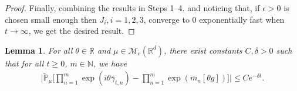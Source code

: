 \documentclass[12pt,a4paper]{amsart}
\theoremstyle{plain}
\newtheorem{lem}[thm]{Lemma}
\theoremstyle{definition}
\numberwithin{equation}{section}
\begin{document}
\begin{proof}
Finally, combining the results in Steps 1--4. and noticing that, if $\epsilon>0$ is chosen small enough then $J_{i}, i = 1,2,3$, converge to $0$ exponentially fast when $t\rightarrow\infty$, we get the desired result.
\end{proof}

\begin{lem}\label{lem:lemma03}
    For all $\theta\in \mathbb{R}$ and $\mu \in \mathcal{M}_c(\mathbb{R}^d)$, there exist constants $C,\delta>0$ such that for all $t\geq 0$, $m\in\mathbb{N}$, we have
    \begin{align}\label{ineq: next we will need}
        \Big|\tilde{\mathbb{P}}_{\mu}\Big[\prod_{n=1}^m\exp(i\theta\bar{\gamma}_{t,n})-\prod_{n=1}^m\exp(\bar{m}_n[\theta g])\Big]\Big|\leq C e^{-\delta t}.
    \end{align}
\end{lem}
\end{document}
